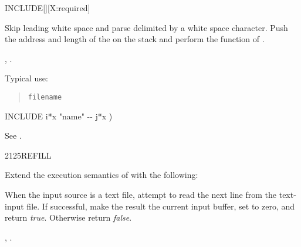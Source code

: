 \begin{worddef}{}{INCLUDE}[][X:required]
\item {}

	Skip leading white space and parse  delimited by a
	white space character. Push the address and length of the
	 on the stack and perform the function of
	.

\see {},
	.

	\begin{rationale} %
		Typical use:
		\begin{quote}
			 \texttt{filename}
		\end{quote}
	\end{rationale}

	\begin{implement} %
		\word{:} INCLUDE  i*x "name" -{}- j*x ) \\
		\tab {}  \word{;}
	\end{implement}

	\begin{testing} %
		See .
	\end{testing}
\end{worddef}


\begin{worddef}{2125}{REFILL}
\item {}

	Extend the execution semantics of 
	with the following:

	When the input source is a text file, attempt to read the next
	line from the text-input file. If successful, make the result
	the current input buffer, set  to zero, and
	return \emph{true}. Otherwise return \emph{false}.

\see {},
	.
\end{worddef}



